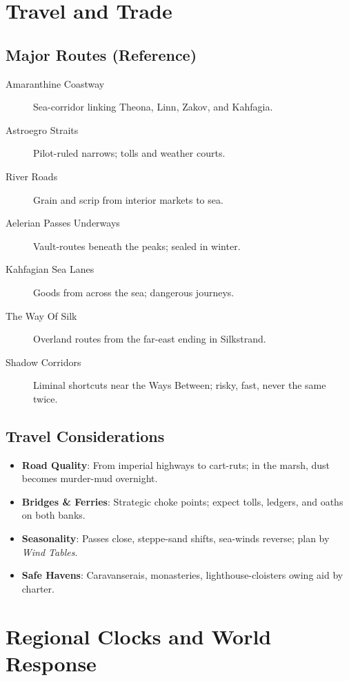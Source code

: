 \section{Travel and Trade}

\subsection*{Major Routes (Reference)}
\begin{description}
\item[Amaranthine Coastway] Sea-corridor linking Theona, Linn, Zakov, and Kahfagia.
\item[Astroegro Straits] Pilot-ruled narrows; tolls and weather courts.
\item[River Roads] Grain and scrip from interior markets to sea.
\item[Aelerian Passes Underways] Vault-routes beneath the peaks; sealed in winter.
\item[Kahfagian Sea Lanes] Goods from across the sea; dangerous journeys.
\item[The Way Of Silk] Overland routes from the far-east ending in Silkstrand.
\item[Shadow Corridors] Liminal shortcuts near the Ways Between; risky, fast, never the same twice.
\end{description}

\subsection*{Travel Considerations}
\begin{itemize}
\item \textbf{Road Quality}: From imperial highways to cart-ruts; in the marsh, dust becomes murder-mud overnight.
\item \textbf{Bridges \& Ferries}: Strategic choke points; expect tolls, ledgers, and oaths on both banks.
\item \textbf{Seasonality}: Passes close, steppe-sand shifts, sea-winds reverse; plan by \emph{Wind Tables}.
\item \textbf{Safe Havens}: Caravanserais, monasteries, lighthouse-cloisters owing aid by charter.
\end{itemize}

\section{Regional Clocks and World Response}

